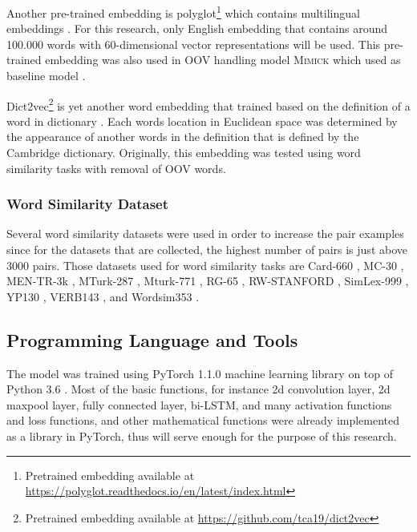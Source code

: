             Another pre-trained embedding is
            polyglot\footnote{Pretrained embedding available at
            \url{https://polyglot.readthedocs.io/en/latest/index.html}}
             which contains multilingual embeddings
            \citep{polyglot2013alrfou}. For this research, only
            English embedding that contains around 100.000 words with
            60-dimensional vector representations will be used. This
            pre-trained embedding was also used in OOV handling model
            \textsc{Mimick} which used as baseline model
            \citep{mimicking2017Pinter}.

            Dict2vec\footnote{Pretrained embedding available at
            \url{https://github.com/tca19/dict2vec}} is yet another word
            embedding that trained based on the definition of a word in
            dictionary \citep{dict2vect2017tissier}. Each words
            location in Euclidean space was determined by the
            appearance of another words in the definition that is
            defined by the Cambridge dictionary. Originally, this
            embedding was tested using word similarity tasks with
            removal of OOV words.

        \subsubsection{Word Similarity Dataset}
            Several word similarity datasets were used in order to
            increase the pair examples since for the datasets that are
            collected, the highest number of pairs is just above 3000
            pairs. Those datasets used for word similarity tasks are
            Card-660 \citep{card660:pilehvar-etal:2018}, MC-30
            \citep{mc30:strongContextualHypothesis}, MEN-TR-3k
            \citep{mentr3k:bruni-etal-2012-distributional}, MTurk-287
            \citep{mturk287:Radinsky:2011:WTC:1963405.1963455},
            Mturk-771
            \citep{mturk771:Halawi:2012:LLW:2339530.2339751}, RG-65
            \citep{rg65:Rubenstein:1965:CCS:365628.365657},
            RW-STANFORD \citep{rw:luong-etal-2013-better}, SimLex-999
            \citep{simlex999:hill2014}, YP130
            \citep{yp130:inproceedings}, VERB143
            \citep{vp143:baker-etal-2014-unsupervised}, and Wordsim353
            \citep{wordsim353:2002:PSC:503104.503110}.

    \subsection{Programming Language and Tools}
        The model was trained using PyTorch 1.1.0 machine learning
        library on top of Python 3.6 \citep{pytorch2017paszke}. Most
        of the basic functions, for instance 2d convolution layer, 2d
        maxpool layer, fully connected layer, bi-LSTM, and many
        activation functions and loss functions, and other mathematical
        functions were already implemented as a library in PyTorch,
        thus will serve enough for the purpose of this research.
            
